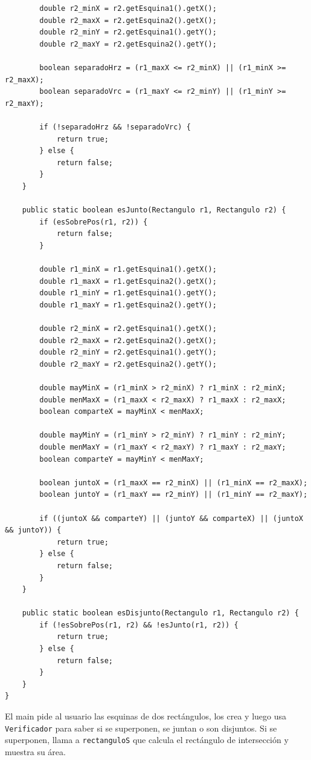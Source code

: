 \documentclass[12pt]{article}
\begin{document}
\begin{enumerate}
\begin{verbatim}
        double r2_minX = r2.getEsquina1().getX();
        double r2_maxX = r2.getEsquina2().getX();
        double r2_minY = r2.getEsquina1().getY();
        double r2_maxY = r2.getEsquina2().getY();

        boolean separadoHrz = (r1_maxX <= r2_minX) || (r1_minX >= r2_maxX);
        boolean separadoVrc = (r1_maxY <= r2_minY) || (r1_minY >= r2_maxY);

        if (!separadoHrz && !separadoVrc) {
            return true;
        } else {
            return false;
        }
    }

    public static boolean esJunto(Rectangulo r1, Rectangulo r2) {
        if (esSobrePos(r1, r2)) {
            return false;
        }

        double r1_minX = r1.getEsquina1().getX();
        double r1_maxX = r1.getEsquina2().getX();
        double r1_minY = r1.getEsquina1().getY();
        double r1_maxY = r1.getEsquina2().getY();

        double r2_minX = r2.getEsquina1().getX();
        double r2_maxX = r2.getEsquina2().getX();
        double r2_minY = r2.getEsquina1().getY();
        double r2_maxY = r2.getEsquina2().getY();

        double mayMinX = (r1_minX > r2_minX) ? r1_minX : r2_minX;
        double menMaxX = (r1_maxX < r2_maxX) ? r1_maxX : r2_maxX;
        boolean comparteX = mayMinX < menMaxX;

        double mayMinY = (r1_minY > r2_minY) ? r1_minY : r2_minY;
        double menMaxY = (r1_maxY < r2_maxY) ? r1_maxY : r2_maxY;
        boolean comparteY = mayMinY < menMaxY;

        boolean juntoX = (r1_maxX == r2_minX) || (r1_minX == r2_maxX);
        boolean juntoY = (r1_maxY == r2_minY) || (r1_minY == r2_maxY);

        if ((juntoX && comparteY) || (juntoY && comparteX) || (juntoX && juntoY)) {
            return true;
        } else {
            return false;
        }
    }

    public static boolean esDisjunto(Rectangulo r1, Rectangulo r2) {
        if (!esSobrePos(r1, r2) && !esJunto(r1, r2)) {
            return true;
        } else {
            return false;
        }
    }
}

\end{verbatim}


El main pide al usuario las esquinas de dos rectángulos, los crea y luego 
usa \texttt{Verificador} para saber si se superponen, se juntan o son disjuntos.
Si se superponen, llama a \texttt{rectanguloS} que calcula el rectángulo 
de intersección y muestra su área.


\end{enumerate}
\end{document}
